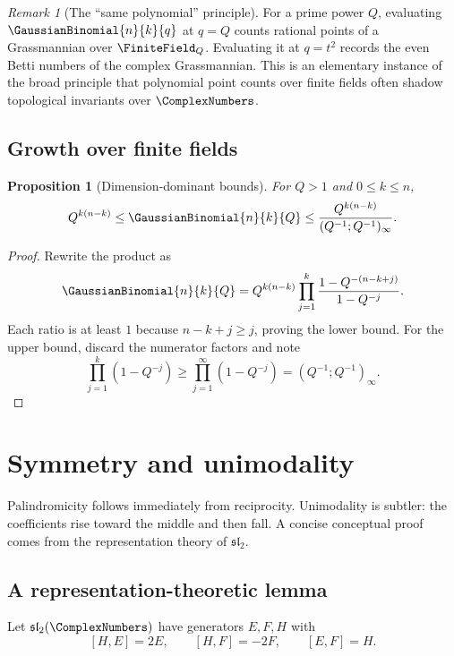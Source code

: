 \documentclass[11pt,a4paper,oneside,openany]{book}
\newtheorem{proposition}[proposition]{Proposition}
\theoremstyle{definition}
\theoremstyle{remark}
\newtheorem{remark}[remark]{Remark}
\begin{document}
\begin{remark}[The ``same polynomial'' principle]
For a prime power $Q$, evaluating $\GaussianBinomial{n}{k}{q}$ at $q=Q$ counts rational points of a Grassmannian over $\FiniteField_{Q}$.  Evaluating it at $q=t^2$ records the even Betti numbers of the complex Grassmannian.  This is an elementary instance of the broad principle that polynomial point counts over finite fields often shadow topological invariants over $\ComplexNumbers$.
\end{remark}

\section{Growth over finite fields}

\begin{proposition}[Dimension-dominant bounds]\label{prop:qbinom-growth}
For $Q>1$ and $0\le k\le n$,
\[
 Q^{k(n-k)}
 \le \GaussianBinomial{n}{k}{Q}
 \le \frac{Q^{k(n-k)}}{(Q^{-1};Q^{-1})_\infty}.
\]
\end{proposition}

\begin{proof}
Rewrite the product as
\[
 \GaussianBinomial{n}{k}{Q}
 =Q^{k(n-k)}
 \prod_{j=1}^{k}\frac{1-Q^{-(n-k+j)}}{1-Q^{-j}}.
\]
Each ratio is at least $1$ because $n-k+j\ge j$, proving the lower bound.  For the upper bound, discard the numerator factors and note
\[
 \prod_{j=1}^{k}(1-Q^{-j})\ge\prod_{j=1}^{\infty}(1-Q^{-j})=(Q^{-1};Q^{-1})_\infty.
\]
\end{proof}

\chapter{Symmetry and unimodality}\label{chap:unimodality}

Palindromicity follows immediately from reciprocity.  Unimodality is subtler: the coefficients rise toward the middle and then fall.  A concise conceptual proof comes from the representation theory of $\mathfrak{sl}_2$.

\section{A representation-theoretic lemma}

Let $\mathfrak{sl}_2(\ComplexNumbers)$ have generators $E,F,H$ with
\[
 [H,E]=2E,\qquad [H,F]=-2F,\qquad [E,F]=H.
\]
\end{document}
